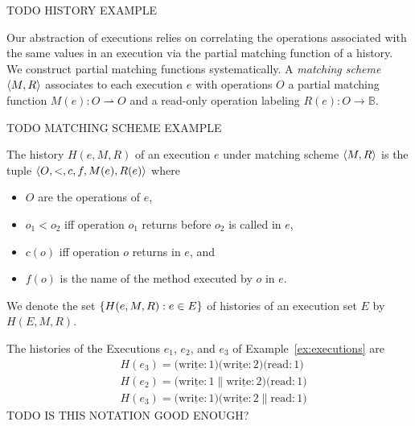 \begin{example}

  TODO HISTORY EXAMPLE

\end{example}

Our abstraction of executions relies on correlating the operations associated
with the same values in an execution via the partial matching function of a
history. We construct partial matching functions systematically. A
\emph{matching scheme} ${\left\langle{M,R}\right\rangle}$ associates to each execution $e$ with
operations $O$ a partial matching function $M(e): O \rightharpoonup O$ and a
read-only operation labeling $R(e): O \to \mathbb{B}$.

\begin{example}

  TODO MATCHING SCHEME EXAMPLE

\end{example}

The history $H(e,M,R)$ of an execution $e$ under matching scheme ${\left\langle{M,R}\right\rangle}$ is
the tuple ${\left\langle{O,<,c,f,M(e),R(e)}\right\rangle}$ where
\begin{itemize}

  \item $O$ are the operations of $e$,

  \item $o_1 < o_2$ if{f} operation $o_1$ returns before $o_2$ is called in $e$,

  \item $c(o)$ if{f} operation $o$ returns in $e$, and

  \item $f(o)$ is the name of the method executed by $o$ in $e$.

\end{itemize}
We denote the set ${\{{H(e,M,R) : e \in E}\}}$ of histories of an execution set
$E$ by $H(E,M,R)$.

\begin{example}

  The histories of the Executions $e_1$, $e_2$, and $e_3$ of
  Example~\ref{ex:executions} are
  \begin{align*}
    & H(e_3) = \big( \underline{\mathrm{write}:1} \big) \big( \underline{\mathrm{write}:2} \big) \big( \mathrm{read}:1 \big) \\
    & H(e_2) = \big( \underline{\mathrm{write}:1} \parallel \underline{\mathrm{write}:2} \big) \big( \mathrm{read}:1 \big) \\
    & H(e_3) = \big( \underline{\mathrm{write}:1} \big) \big( \underline{\mathrm{write}:2} \parallel \mathrm{read}:1 \big)
  \end{align*}
  TODO IS THIS NOTATION GOOD ENOUGH?

\end{example}

